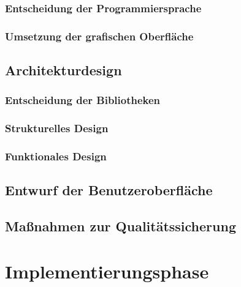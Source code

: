 \documentclass[ngerman,11pt,a4paper,titlepage]{article}
\begin{document}
	\subsubsection{Entscheidung der Programmiersprache}
	\label{subsubsec:programmiersprache}
	\programmierspracheText
	
	\subsubsection{Umsetzung der grafischen Oberfläche}
	\label{subsubsec:grafischeoberflaeche}
	\grafischeOberflaecheText
	
	\subsection{Architekturdesign}
	\label{subsec:architekturdesign}
	\architekturdesignText
	
	\subsubsection{Entscheidung der Bibliotheken}
	\label{subsubsec:bibliotheken}
	\bibliothekenText
	
	\subsubsection{Strukturelles Design}
	\label{subsubsec:strukturellesdesign}
	\strukturellesDesignText
	
	\subsubsection{Funktionales Design}
	\label{subsubsec:funktionalesdesign}
	\funktionalesDesignText
	
	\subsection{Entwurf der Benutzeroberfläche}
	\label{subsec:entwurfbenuzteroberflaeche}
	\entwurfbenuzteroberflaecheText
	
	\subsection{Maßnahmen zur Qualitätssicherung}
	\label{subsec:massnahmenqualitaetssicherung}
	\massnahmenQualitaetssicherungText
	\pagebreak
		
	\section{Implementierungsphase}
	\label{sec:implementierungsphase}
	\implementierungproviderText
	
\end{document}
